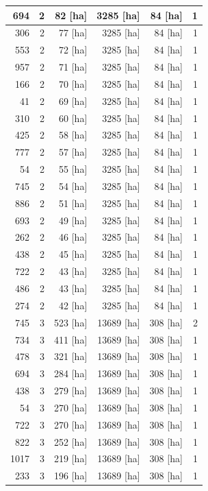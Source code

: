\documentclass[11pt,]{book}
\begin{document}
\begin{table}
\begin{tabular}[t]{r|r|r|r|r|r}
\hline
694 & 2 & 82 [ha] & 3285 [ha] & 84 [ha] & 1\\
\hline
306 & 2 & 77 [ha] & 3285 [ha] & 84 [ha] & 1\\
\hline
553 & 2 & 72 [ha] & 3285 [ha] & 84 [ha] & 1\\
\hline
957 & 2 & 71 [ha] & 3285 [ha] & 84 [ha] & 1\\
\hline
166 & 2 & 70 [ha] & 3285 [ha] & 84 [ha] & 1\\
\hline
41 & 2 & 69 [ha] & 3285 [ha] & 84 [ha] & 1\\
\hline
310 & 2 & 60 [ha] & 3285 [ha] & 84 [ha] & 1\\
\hline
425 & 2 & 58 [ha] & 3285 [ha] & 84 [ha] & 1\\
\hline
777 & 2 & 57 [ha] & 3285 [ha] & 84 [ha] & 1\\
\hline
54 & 2 & 55 [ha] & 3285 [ha] & 84 [ha] & 1\\
\hline
745 & 2 & 54 [ha] & 3285 [ha] & 84 [ha] & 1\\
\hline
886 & 2 & 51 [ha] & 3285 [ha] & 84 [ha] & 1\\
\hline
693 & 2 & 49 [ha] & 3285 [ha] & 84 [ha] & 1\\
\hline
262 & 2 & 46 [ha] & 3285 [ha] & 84 [ha] & 1\\
\hline
438 & 2 & 45 [ha] & 3285 [ha] & 84 [ha] & 1\\
\hline
722 & 2 & 43 [ha] & 3285 [ha] & 84 [ha] & 1\\
\hline
486 & 2 & 43 [ha] & 3285 [ha] & 84 [ha] & 1\\
\hline
274 & 2 & 42 [ha] & 3285 [ha] & 84 [ha] & 1\\
\hline
745 & 3 & 523 [ha] & 13689 [ha] & 308 [ha] & 2\\
\hline
734 & 3 & 411 [ha] & 13689 [ha] & 308 [ha] & 1\\
\hline
478 & 3 & 321 [ha] & 13689 [ha] & 308 [ha] & 1\\
\hline
694 & 3 & 284 [ha] & 13689 [ha] & 308 [ha] & 1\\
\hline
438 & 3 & 279 [ha] & 13689 [ha] & 308 [ha] & 1\\
\hline
54 & 3 & 270 [ha] & 13689 [ha] & 308 [ha] & 1\\
\hline
722 & 3 & 270 [ha] & 13689 [ha] & 308 [ha] & 1\\
\hline
822 & 3 & 252 [ha] & 13689 [ha] & 308 [ha] & 1\\
\hline
1017 & 3 & 219 [ha] & 13689 [ha] & 308 [ha] & 1\\
\hline
233 & 3 & 196 [ha] & 13689 [ha] & 308 [ha] & 1\\

\end{tabular}
\end{table}
\end{document}
